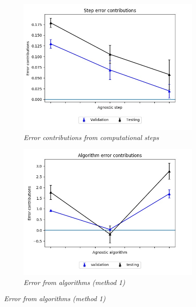 \begin{figure}[H]
\centering
\begin{subfigure}{.5\textwidth}
  \centering
  \includegraphics[scale=0.4]{img/EP/agnostic_error_step_val_test_breast}
  \caption{\textit{Error contributions from computational steps}}
  \label{fig:sfig1}
\end{subfigure}%
\begin{subfigure}{.5\textwidth}
  \centering
  \includegraphics[scale=0.4]{img/EP/agnostic_error_alg_breast_test}
  \caption{\textit{Error  from algorithms (\textit{method 1})}}
  \label{fig:sfig1}
\end{subfigure}

\end{figure}
